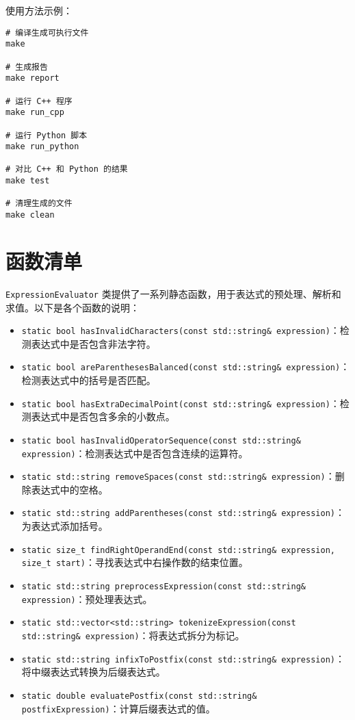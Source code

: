 \documentclass[UTF8]{ctexart}
\begin{document}
使用方法示例：

\begin{verbatim}
# 编译生成可执行文件
make

# 生成报告
make report

# 运行 C++ 程序
make run_cpp

# 运行 Python 脚本
make run_python

# 对比 C++ 和 Python 的结果
make test

# 清理生成的文件
make clean
\end{verbatim}

\section{函数清单}

\texttt{ExpressionEvaluator} 类提供了一系列静态函数，用于表达式的预处理、解析和求值。以下是各个函数的说明：

\begin{itemize}
  \item \texttt{static bool hasInvalidCharacters(const std::string\& expression)}：检测表达式中是否包含非法字符。
  \item \texttt{static bool areParenthesesBalanced(const std::string\& expression)}：检测表达式中的括号是否匹配。
  \item \texttt{static bool hasExtraDecimalPoint(const std::string\& expression)}：检测表达式中是否包含多余的小数点。
  \item \texttt{static bool hasInvalidOperatorSequence(const std::string\& expression)}：检测表达式中是否包含连续的运算符。
  \item \texttt{static std::string removeSpaces(const std::string\& expression)}：删除表达式中的空格。
  \item \texttt{static std::string addParentheses(const std::string\& expression)}：为表达式添加括号。
  \item \texttt{static size\_t findRightOperandEnd(const std::string\& expression, size\_t start)}：寻找表达式中右操作数的结束位置。
  \item \texttt{static std::string preprocessExpression(const std::string\& expression)}：预处理表达式。
  \item \texttt{static std::vector<std::string> tokenizeExpression(const std::string\& expression)}：将表达式拆分为标记。
  \item \texttt{static std::string infixToPostfix(const std::string\& expression)}：将中缀表达式转换为后缀表达式。
  \item \texttt{static double evaluatePostfix(const std::string\& postfixExpression)}：计算后缀表达式的值。
\end{itemize}
\end{document}

